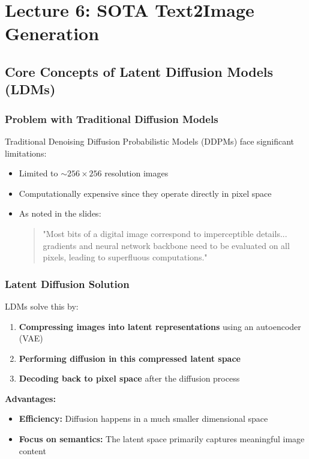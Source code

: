 \chapter{\normalsize Lecture 6: SOTA Text2Image Generation}

\section{Core Concepts of Latent Diffusion Models (LDMs)}

\subsection*{Problem with Traditional Diffusion Models}
Traditional Denoising Diffusion Probabilistic Models (DDPMs) face significant limitations:
\begin{itemize}
    \item Limited to $\sim256\times256$ resolution images
    \item Computationally expensive since they operate directly in pixel space
    \item As noted in the slides: 
    \begin{quote}
        "Most bits of a digital image correspond to imperceptible details... gradients and neural network backbone need to be evaluated on all pixels, leading to superfluous computations."
    \end{quote}
\end{itemize}

\subsection*{Latent Diffusion Solution}
LDMs solve this by:
\begin{enumerate}
    \item \textbf{Compressing images into latent representations} using an autoencoder (VAE)
    \item \textbf{Performing diffusion in this compressed latent space}
    \item \textbf{Decoding back to pixel space} after the diffusion process
\end{enumerate}

\textbf{Advantages:}
\begin{itemize}
    \item \textbf{Efficiency:} Diffusion happens in a much smaller dimensional space
    \item \textbf{Focus on semantics:} The latent space primarily captures meaningful image content
\end{itemize}

